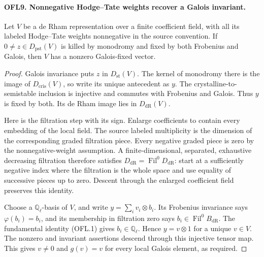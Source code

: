 \documentclass[11pt,a4paper]{article}
\numberwithin{equation}{section}
\theoremstyle{remark}\newtheorem{remark}[theorem]{Remark}
\begin{document}
\paragraph{OFL9. Nonnegative Hodge--Tate weights recover a Galois invariant.}
\label{claim:OFL9}
Let \(V\) be a de Rham representation over a finite coefficient
field, with all its labeled Hodge--Tate weights nonnegative in the
source convention.  If \(0\ne z\in D_{\mathrm{pst}}(V)\)
is killed by monodromy and fixed by both Frobenius and Galois, then
\(V\) has a nonzero Galois-fixed vector.
\begin{proof}
Galois invariance puts \(z\) in \(D_{\mathrm{st}}(V)\).
The kernel of monodromy there is the image of
\(D_{\mathrm{cris}}(V)\), so write its unique antecedent as
\(y\).  The crystalline-to-semistable inclusion is injective and
commutes with Frobenius and Galois.  Thus \(y\) is fixed by both.
Its de Rham image lies in \(D_{\mathrm{dR}}(V)\).

Here is the filtration step with its sign.  Enlarge coefficients
to contain every embedding of the local field.  The source labeled
multiplicity is the dimension of the corresponding graded
filtration piece.  Every negative graded piece is zero by the
nonnegative-weight assumption.  A finite-dimensional, separated,
exhaustive decreasing filtration therefore satisfies
\(D_{\mathrm{dR}}=\operatorname{Fil}^0D_{\mathrm{dR}}\):
start at a sufficiently negative index where the filtration is the
whole space and use equality of successive pieces up to zero.
Descent through the enlarged coefficient field preserves this
identity.

Choose a \(\mathbb Q_\ell\)-basis of \(V\), and write
\(y=\sum_i v_i\otimes b_i\).  Its Frobenius invariance says
\(\varphi(b_i)=b_i\), and its membership in filtration zero
says \(b_i\in\operatorname{Fil}^0B_{\mathrm{dR}}\).
The fundamental identity (OFL.1) gives \(b_i\in\mathbb Q_\ell\).
Hence \(y=v\otimes1\) for a unique \(v\in V\).
The nonzero and invariant assertions descend through this injective
tensor map.  This gives \(v\ne0\) and \(g(v)=v\) for every
local Galois element, as required.
\end{proof}

\end{document}
